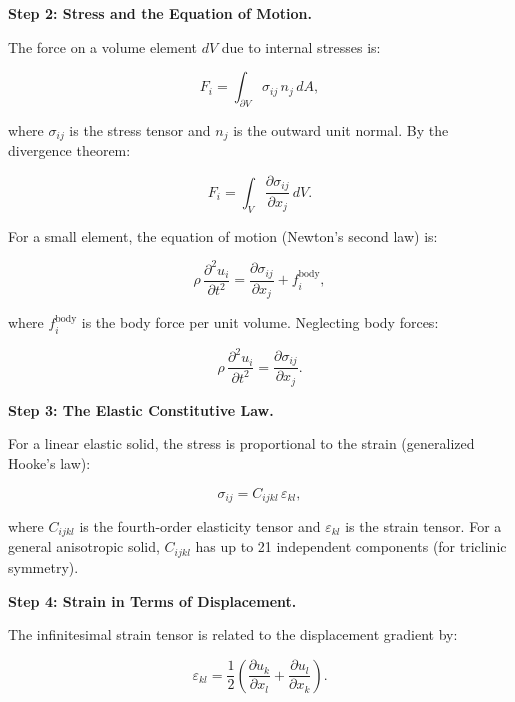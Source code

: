 \textbf{Step 2: Stress and the Equation of Motion.}

The force on a volume element $dV$ due to internal stresses is:

\begin{equation}
F_i = \int_{\partial V} \sigma_{ij}\,n_j\,dA,
\end{equation}

where $\sigma_{ij}$ is the stress tensor and $n_j$ is the outward unit normal. By the divergence theorem:

\begin{equation}
F_i = \int_V \frac{\partial \sigma_{ij}}{\partial x_j}\,dV.
\end{equation}

For a small element, the equation of motion (Newton's second law) is:

\begin{equation}
\rho\,\frac{\partial^2 u_i}{\partial t^2} = \frac{\partial \sigma_{ij}}{\partial x_j} + f_i^{\text{body}},
\end{equation}

where $f_i^{\text{body}}$ is the body force per unit volume. Neglecting body forces:

\begin{equation}
\rho\,\frac{\partial^2 u_i}{\partial t^2} = \frac{\partial \sigma_{ij}}{\partial x_j}. \tag{1}
\end{equation}

\textbf{Step 3: The Elastic Constitutive Law.}

For a linear elastic solid, the stress is proportional to the strain (generalized Hooke's law):

\begin{equation}
\sigma_{ij} = C_{ijkl}\,\varepsilon_{kl},
\end{equation}

where $C_{ijkl}$ is the fourth-order elasticity tensor and $\varepsilon_{kl}$ is the strain tensor. For a general anisotropic solid, $C_{ijkl}$ has up to 21 independent components (for triclinic symmetry).

\textbf{Step 4: Strain in Terms of Displacement.}

The infinitesimal strain tensor is related to the displacement gradient by:

\begin{equation}
\varepsilon_{kl} = \frac{1}{2}\left(\frac{\partial u_k}{\partial x_l} + \frac{\partial u_l}{\partial x_k}\right).
\end{equation}

